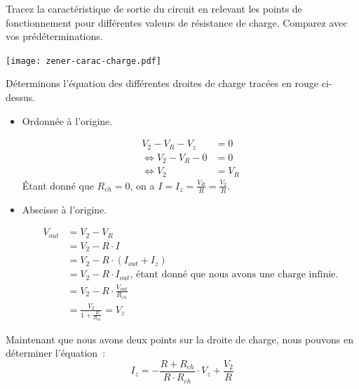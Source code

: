 \documentclass{../template/labo}
\begin{document}
\Question
{
	Tracez la caractéristique de sortie du circuit en relevant les points de fonctionnement pour différentes valeurs de résistance de charge. Comparez avec vos prédéterminations.
}
{
\begin{center}
\texttt{[image: zener-carac-charge.pdf]}
\end{center}

Déterminons l'équation des différentes droites de charge tracées en rouge ci-dessus.

\begin{itemize}
\item Ordonnée à l'origine.

\begin{align*}
V_2 - V_R - V_z & = 0 \\
\Leftrightarrow V_2 - V_R - 0 & = 0 \\
\Leftrightarrow V_2 & = V_R
\end{align*}
Étant donné que $R_{ch} = 0$, on a $I = I_z = \frac{V_R}{R} = \frac{V_2}{R}$.

\item Abscisse à l'origine.

\begin{align*}
V_{out} & = V_2 - V_R\\
& = V_2 - R \cdot I \\
& = V_2 - R \cdot (I_{out} + I_z) \\
& = V_2 - R \cdot I_{out} \mbox{, étant donné que nous avons une charge infinie.} \\
& = V_2 - R \cdot \frac{V_{out}}{R_{ch}} \\
& = \frac{V_2}{1+ \frac{R}{R_{ch}}} = V_z
\end{align*}
\end{itemize}

Maintenant que nous avons deux points sur la droite de charge, nous pouvons en déterminer l'équation~:
\[I_z = - \frac{R + R_{ch}}{R \cdot R_{ch}} \cdot V_z + \frac{V_2}{R}\]



}%
	\label{Q:27}
\end{document}
